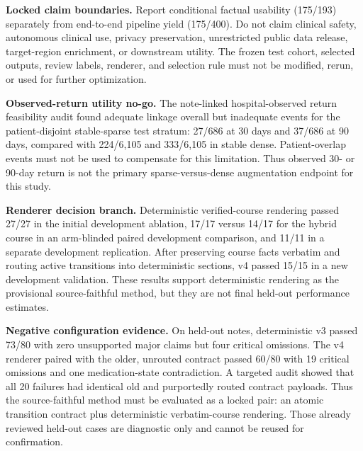 \documentclass[11pt]{article}
\begin{document}
\textbf{Locked claim boundaries.} Report conditional factual usability
(175/193) separately from end-to-end pipeline yield (175/400). Do not claim
clinical safety, autonomous clinical use, privacy preservation, unrestricted
public data release, target-region enrichment, or downstream utility. The
frozen test cohort, selected outputs, review labels, renderer, and selection
rule must not be modified, rerun, or used for further optimization.

\textbf{Observed-return utility no-go.} The note-linked hospital-observed
return feasibility audit found adequate linkage overall but inadequate events
for the patient-disjoint stable-sparse test stratum: 27/686 at 30 days and
37/686 at 90 days, compared with 224/6,105 and 333/6,105 in stable dense.
Patient-overlap events must not be used to compensate for this limitation.
Thus observed 30- or 90-day return is not the primary sparse-versus-dense
augmentation endpoint for this study.

\textbf{Renderer decision branch.} Deterministic verified-course rendering
passed 27/27 in the initial development ablation, 17/17 versus 14/17 for the
hybrid course in an arm-blinded paired development comparison, and 11/11 in a
separate development replication. After preserving course facts verbatim and
routing active transitions into deterministic sections, v4 passed 15/15 in a
new development validation. These results support deterministic rendering as
the provisional source-faithful method, but they are not final held-out
performance estimates.

\textbf{Negative configuration evidence.} On held-out notes, deterministic
v3 passed 73/80 with zero unsupported major claims but four critical omissions.
The v4 renderer paired with the older, unrouted contract passed 60/80 with 19
critical omissions and one medication-state contradiction. A targeted audit
showed that all 20 failures had identical old and purportedly routed contract
payloads. Thus the source-faithful method must be evaluated as a locked pair:
an atomic transition contract plus deterministic verbatim-course rendering.
Those already reviewed held-out cases are diagnostic only and cannot be reused
for confirmation.
\end{document}

